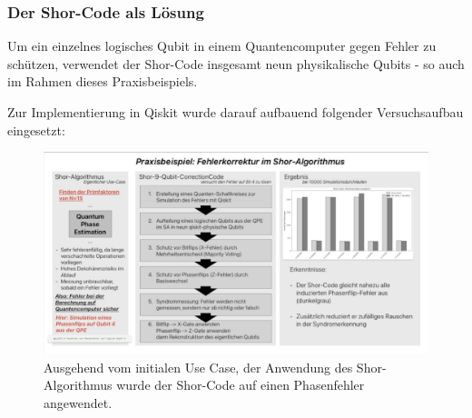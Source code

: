 \subsubsection{Der Shor-Code als Lösung}
Um ein einzelnes logisches Qubit in einem Quantencomputer gegen Fehler zu schützen, verwendet der Shor-Code insgesamt neun physikalische Qubits - so auch im Rahmen dieses Praxisbeispiels.

Zur Implementierung in Qiskit wurde darauf aufbauend folgender Versuchsaufbau eingesetzt:

\begin{figure}
    \centering
    \includegraphics[width=1.0\linewidth]{images/praxis-example/study-design.png}
    \caption{Ausgehend vom initialen Use Case, der Anwendung des Shor-Algorithmus wurde der Shor-Code auf einen Phasenfehler angewendet.}
    \label{fig:study-design}
\end{figure}

